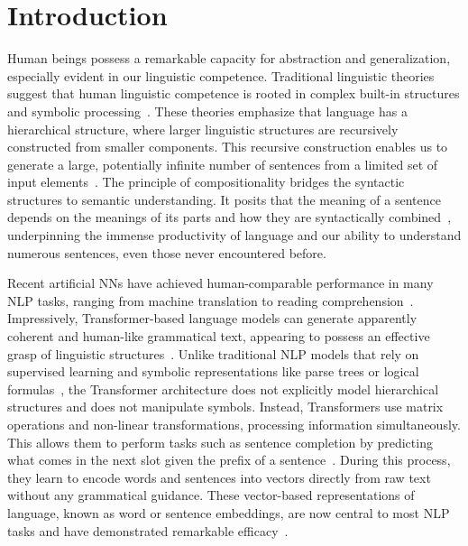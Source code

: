 \chapter{Introduction}

Human beings possess a remarkable capacity for abstraction and generalization, especially evident in our linguistic competence. Traditional linguistic theories suggest that human linguistic competence is rooted in complex built-in structures and symbolic processing~\citep{chomsky1965aspects,chomsky1986knowledge,pinker1988language}. These theories emphasize that language has a hierarchical structure, where larger linguistic structures are recursively constructed from smaller components. This recursive construction enables us to generate a large, potentially infinite number of sentences from a limited set of input elements~\citep{hauser2002faculty}. The principle of compositionality bridges the syntactic structures to semantic understanding. It posits that the meaning of a sentence depends on the meanings of its parts and how they are syntactically combined~\citep{frege_1892, partee1984compositionality}, underpinning the immense productivity of language and our ability to understand numerous sentences, even those never encountered before.


Recent artificial \ac{NNs} have achieved human-comparable performance in many \ac{NLP} tasks, ranging from machine translation to reading comprehension~\citep{bubeck2023sparks}. Impressively, Transformer-based language models can generate apparently coherent and human-like grammatical text, appearing to possess an effective grasp of linguistic structures~\citep{brown2020language,openai2023gpt4}. Unlike traditional NLP models that rely on supervised learning and symbolic representations like parse trees or logical formulas~\citep{jurafsky2000speech}, the Transformer architecture does not explicitly model hierarchical structures and does not manipulate symbols. Instead, Transformers use matrix operations and non-linear transformations, processing information simultaneously. This allows them to perform tasks such as sentence completion by predicting what comes in the next slot given the prefix of a sentence~\citep{elman1990finding,NIPS2017_3f5ee243}. During this process, they learn to encode words and sentences into vectors directly from raw text without any grammatical guidance. These vector-based representations of language, known as word or sentence embeddings, are now central to most NLP tasks and have demonstrated remarkable efficacy~\citep{devlin-etal-2019-bert,gonzalez2020comparing,choi2021evaluation}. 


